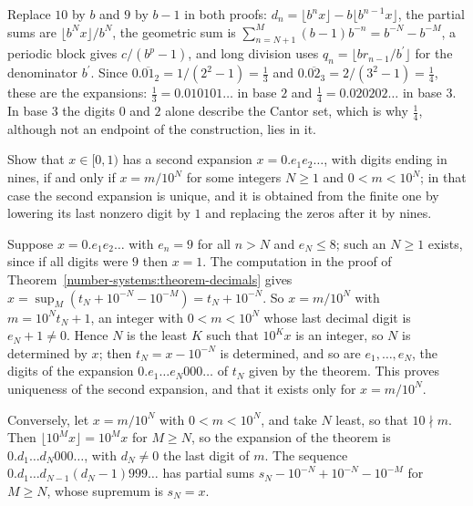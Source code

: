 \begin{solution}
Replace $10$ by $b$ and $9$ by $b - 1$ in both proofs: $d_n = \lfloor b^nx\rfloor - b\lfloor b^{n-1}x\rfloor$, the partial sums are $\lfloor b^Nx\rfloor/b^N$, the geometric sum is
$\sum_{n=N+1}^M(b - 1)b^{-n} = b^{-N} - b^{-M}$, a periodic block gives $c/(b^p - 1)$, and long division uses $q_n = \lfloor br_{n-1}/b^{\prime}\rfloor$ for the denominator $b^{\prime}$. Since
$0.\overline{01}_2 = 1/(2^2 - 1) = \frac13$ and $0.\overline{02}_3 = 2/(3^2 - 1) = \frac14$, these are the expansions: $\frac13 = 0.010101\ldots$ in base $2$ and $\frac14 = 0.020202\ldots$ in base $3$. In base $3$ the
digits $0$ and $2$ alone describe the Cantor set, which is why $\frac14$, although not an endpoint of the construction, lies in it.
\end{solution}

\begin{exercise}\label{number-systems:exercise-two-expansions}
Show that $x \in [0, 1)$ has a second expansion $x = 0.e_1e_2\ldots$, with digits ending in nines, if and only if $x = m/10^N$ for some integers $N \geq 1$ and $0 < m < 10^N$; in that case the second expansion is unique,
and it is obtained from the finite one by lowering its last nonzero digit by $1$ and replacing the zeros after it by nines.
\end{exercise}

\begin{solution}
Suppose $x = 0.e_1e_2\ldots$ with $e_n = 9$ for all $n > N$ and $e_N \leq 8$; such an $N \geq 1$ exists, since if all digits were $9$ then $x = 1$. The computation in the proof of
Theorem~\ref{number-systems:theorem-decimals} gives $x = \sup_M(t_N + 10^{-N} - 10^{-M}) = t_N + 10^{-N}$. So $x = m/10^N$ with $m = 10^Nt_N + 1$, an integer with $0 < m < 10^N$ whose last decimal digit is
$e_N + 1 \neq 0$. Hence $N$ is the least $K$ such that $10^Kx$ is an integer, so $N$ is determined by $x$; then $t_N = x - 10^{-N}$ is determined, and so are $e_1, \ldots, e_N$, the digits of the expansion
$0.e_1 \ldots e_N000\ldots$ of $t_N$ given by the theorem. This proves uniqueness of the second expansion, and that it exists only for $x = m/10^N$.

Conversely, let $x = m/10^N$ with $0 < m < 10^N$, and take $N$ least, so that $10 \nmid m$. Then $\lfloor 10^Mx\rfloor = 10^Mx$ for $M \geq N$, so the expansion of the theorem is $0.d_1 \ldots d_N000\ldots$, with
$d_N \neq 0$ the last digit of $m$. The sequence $0.d_1 \ldots d_{N-1}(d_N - 1)999\ldots$ has partial sums $s_N - 10^{-N} + 10^{-N} - 10^{-M}$ for $M \geq N$, whose supremum is $s_N = x$.
\end{solution}

